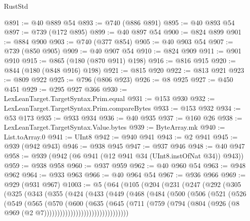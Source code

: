 \begin{lexlean}{RustStd}
\begin{coremodule}
{\begin{coremodule}
{{{{{{{{{{{{{{{{{{{{{{{{{{{{{{{{{{{@891 := @40 @889 @54
@893 := @740 (@886 @891)
@895 := @40 @893 @54
@897 := @739 (@172 @895)
@899 := @40 @897 @54
@900 := @824 @899
@901 := @884 @900
@903 := @740 (@377 @854)
@905 := @40 @903 @54
@907 := @739 (@850 @905)
@909 := @40 @907 @54
@910 := @824 @909
@911 := @901 @910
@915 := @865 (@180 (@870 @911) @198)
@916 := @816 @915
@920 := @844 (@180 (@848 @916) @198)
@921 := @815 @920
@922 := @813 @921
@923 := @809 @922
@925 := @796 (@806 @923)
@926 := @8 @925
@927 := @450 @451
@929 := @295 @927 @366
@930 := LexLeanTarget.TargetSyntax.Prim.equal
@931 := @153 @930
@932 := LexLeanTarget.TargetSyntax.Prim.compareBytes
@933 := @153 @932
@934 := @53 @173
@935 := @933 @934
@936 := @40 @935
@937 := @160 @26
@938 := LexLeanTarget.TargetSyntax.Value.bytes
@939 := ByteArray.mk
@940 := List.toArray.{0}
@941 := UInt8
@942 := @940 @941
@943 := @2 @941
@945 := @939 (@942 @943)
@946 := @938 @945
@947 := @937 @946
@948 := @40 @947
@958 := @939 (@942 (@6 @941 (@12 @941 @34 (UInt8.instOfNat @34)) @943))
@959 := @938 @958
@960 := @937 @959
@962 := @40 @960 @54
@963 := @948 @962
@964 := @933 @963
@966 := @40 @964 @54
@967 := @936 @966
@969 := @929 (@931 @967)
@1003 := @5
    (@64
      (@105
        (@204
          (@231
            (@247
              (@292
                (@305
                  (@325
                    (@343
                      (@355
                        (@424
                          (@433
                            (@449
                              (@468
                                (@484
                                  (@500
                                    (@506
                                      (@521
                                        (@526
                                          (@549
                                            (@565
                                              (@570
                                                (@600
                                                  (@635
                                                    (@645
                                                      (@711
                                                        (@759
                                                          (@794
                                                            (@804
                                                              (@926
                                                                (@8
                                                                  @969
                                                                  (@2
                                                                    @7))))))))))))))))))))))))))))))))
}}}}}}}}}}}}}}}}}}}}}}}}}}}}}}}}}}}
\end{coremodule}}
\end{coremodule}
\end{lexlean}
